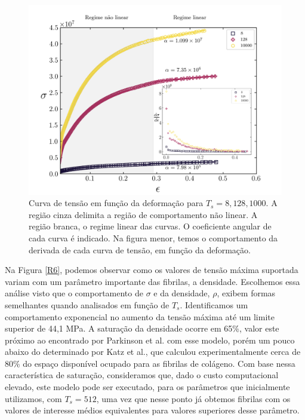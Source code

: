 \documentclass{article}
\begin{document}
    \begin{figure}[H]
        \centering
        \includegraphics[width=\textwidth]{figures/stress_fit.png}

        \caption{Curva de tensão em função da deformação para \(T_{s} = 8, 128, 1000\). A região cinza delimita a 
        região de comportamento não linear. A região branca, o regime linear das curvas. O coeficiente angular de cada 
        curva é indicado. Na figura menor, temos o comportamento da derivada de cada curva de tensão, em função da 
        deformação.} 

        \label{R8}
    \end{figure}

    Na Figura \ref{R6}, podemos observar como os valores de tensão máxima suportada variam com um parâmetro 
    importante das fibrilas, a densidade. Escolhemos essa análise visto que o comportamento de \(\sigma\) e da 
    densidade, \(\rho\), exibem formas semelhantes quando analisados em função de \(T_{s}\). Identificamos um 
    comportamento exponencial no aumento da tensão máxima até um limite superior de 44,1 MPa. A saturação da 
    densidade ocorre em 65\%, valor este próximo ao encontrado por Parkinson et al.\cite{Parkinson1995} com esse 
    modelo, porém um pouco abaixo do determinado por Katz et al.\cite{KATZ1973351}, que calculou experimentalmente 
    cerca de 80\% do espaço disponível ocupado para as fibrilas de colágeno. Com base nessa característica de 
    saturação, consideramos que, dado o custo computacional elevado, este modelo pode ser executado, para os parâmetros 
    que inicialmente utilizamos, com \(T_{s}=512\), uma vez que nesse ponto já obtemos fibrilas com os valores de 
    interesse médios equivalentes para valores superiores desse parâmetro. 
\end{document}
